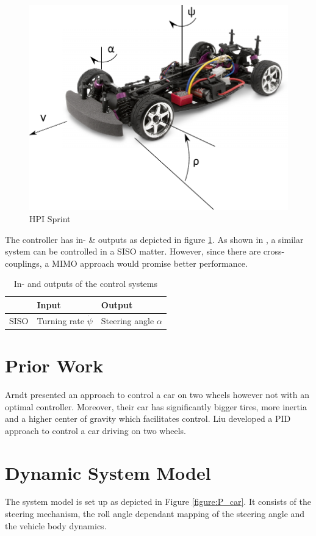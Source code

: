 \documentclass[conference]{IEEEtran}
\begin{document}
\begin{figure}[h!]
\centering
  \includegraphics[width=.3\textwidth]{pics/hpisprintgeom.pdf} 
  \caption{HPI Sprint}  
  \label{figure:hpi_sprint}
\end{figure}

The controller has in- \& outputs as depicted in figure \ref{figure:controlinout}. As shown in \cite{bib:arndt}, a similar system can be controlled in a SISO matter. However, since there are cross-couplings, a MIMO approach would promise better performance.

\begin{table}[h]
\begin{center}
\begin{tabular}{|l||l|l|}
\hline
 		& Input 		& Output\\
\hline
SISO 	& Turning rate $\dot{\psi}$ 	& Steering angle $\alpha$\\
\hline
\end{tabular}
\caption{In- and outputs of the control systems}  
\label{figure:controlinout}
\end{center}
\end{table}


\section{Prior Work}

Arndt \cite{bib:arndt} presented an approach to control a car on two wheels however not with an optimal controller. Moreover, their car has significantly bigger tires, more inertia and a higher center of gravity which facilitates control. Liu \cite{bib:liu} developed a PID approach to control a car driving on two wheels.

\section{Dynamic System Model}

The system model is set up as depicted in Figure \ref{figure:P_car}. It consists of the steering mechanism, the roll angle dependant mapping of the steering angle and the vehicle body dynamics.
\end{document}

